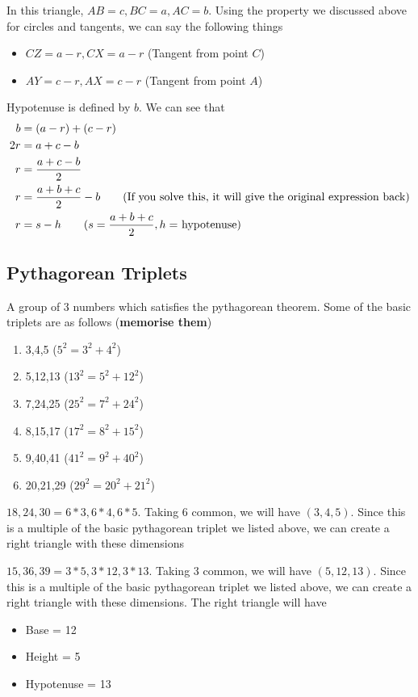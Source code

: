 In this triangle, $AB = c, BC = a, AC = b$. Using the property we discussed above for circles and tangents, we can say the following things
\begin{itemize}
    \item  $CZ = a - r, CX = a - r$ (Tangent from point $C$)
    \item  $AY = c - r, AX = c - r$ (Tangent from point $A$)
\end{itemize}

Hypotenuse is defined by $b$. We can see that
\begin{align*}
    b &= (a - r) + (c - r) \\
    2r &= a + c - b \\
    r &= \dfrac{a + c - b}{2} \\
    r &= \dfrac{a + b + c}{2} - b \tag{If you solve this, it will give the original expression back} \\
    r &= s - h \tag{$s = \dfrac{a + b + c}{2}, h = $ hypotenuse}
\end{align*}

\subsection{Pythagorean Triplets}
A group of 3 numbers which satisfies the pythagorean theorem. Some of the basic triplets are as follows (\textbf{memorise them})
\begin{enumerate}
    \item 3,4,5 ($5^2 = 3^2 + 4^2$)
    \item 5,12,13 ($13^2 = 5^2 + 12^2$)
    \item 7,24,25 ($25^2 = 7^2 + 24^2$)
    \item 8,15,17 ($17^2 = 8^2 + 15^2$)
    \item 9,40,41 ($41^2 = 9^2 + 40^2$)
    \item 20,21,29 ($29^2 = 20^2 + 21^2$)
\end{enumerate}


$18,24,30 = 6 * 3, 6 * 4, 6 * 5$. Taking 6 common, we will have $(3,4,5)$. Since this is a multiple of the basic pythagorean triplet we listed above, we can create a right triangle with these dimensions


$15, 36, 39 = 3 * 5, 3 * 12, 3 * 13$. Taking 3 common, we will have $(5,12,13)$. Since this is a multiple of the basic pythagorean triplet we listed above, we can create a right triangle with these dimensions. The right triangle will have 
\begin{itemize}
    \item Base = 12
    \item Height = 5
    \item Hypotenuse = 13
\end{itemize}


